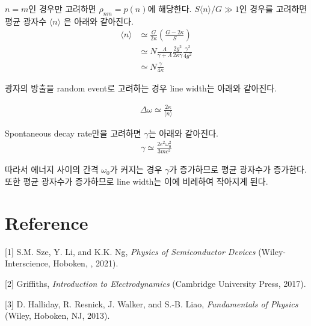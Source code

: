 \documentclass[%
 reprint,
 amsmath,amssymb,
 aps,
]{revtex4-2}
\begin{document}
$n=m$인 경우만 고려하면 $\rho_{nm} = p(n)$에 해당한다. $S\langle n \rangle / G \gg 1$인 경우를 고려하면 평균 광자수 $\langle n \rangle$ 은 아래와 같아진다.
\begin{align}
	\langle n \rangle &\simeq \frac{G}{2\kappa}\left( \frac{G-2\kappa}{S} \right)\\
	&\simeq N\frac{\Lambda}{\gamma + \Lambda} \frac{2g^{2}}{2\kappa\gamma} \frac{\gamma^{2}}{4g^{2}}\\
	& \simeq N\frac{\gamma}{4\kappa}
\end{align}

광자의 방출을 random event로 고려하는 경우 line width는 아래와 같아진다.

\begin{align}
	\Delta \omega \simeq \frac{2\kappa}{\langle n \rangle}
\end{align}

Spontaneous decay rate만을 고려하면 $\gamma$는 아래와 같아진다.
\begin{align}
	\gamma \simeq \frac{2e^{2}\omega_{0}^{2}}{3mc^{2}}
\end{align}

따라서 에너지 사이의 간격 $\omega_{0}$가 커지는 경우 $\gamma$가 증가하므로 평균 광자수가 증가한다. 또한 평균 광자수가 증가하므로 line width는 이에 비례하여 작아지게 된다.

\section{\label{sec:level1}Reference}
[1] S.M. Sze, Y. Li, and K.K. Ng, \textit{Physics of Semiconductor Devices} (Wiley-Interscience, Hoboken, , 2021). 

[2] Griffiths, \textit{Introduction to Electrodynamics} (Cambridge University Press, 2017). 

[3] D. Halliday, R. Resnick, J. Walker, and S.-B. Liao, \textit{Fundamentals of Physics} (Wiley, Hoboken, NJ, 2013). 
\end{document}
